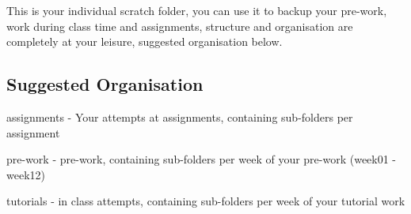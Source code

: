This is your individual scratch folder, you can use it to backup your pre-\/work, work during class time and assignments, structure and organisation are completely at your leisure, suggested organisation below.

\subsection*{Suggested Organisation}


\begin{DoxyItemize}
\item assignments -\/ Your attempts at assignments, containing sub-\/folders per assignment
\item pre-\/work -\/ pre-\/work, containing sub-\/folders per week of your pre-\/work (week01 -\/ week12)
\item tutorials -\/ in class attempts, containing sub-\/folders per week of your tutorial work 
\end{DoxyItemize}